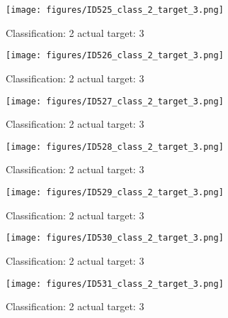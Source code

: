 \begin{figure}[h!]
\begin{center}
\texttt{[image: figures/ID525\_class\_2\_target\_3.png]}
\end{center}
\caption{ Classification: 2 actual target: 3}
\label{fig:ID525_class_2_target_3}
\end{figure}
\begin{figure}[h!]
\begin{center}
\texttt{[image: figures/ID526\_class\_2\_target\_3.png]}
\end{center}
\caption{ Classification: 2 actual target: 3}
\label{fig:ID526_class_2_target_3}
\end{figure}
\begin{figure}[h!]
\begin{center}
\texttt{[image: figures/ID527\_class\_2\_target\_3.png]}
\end{center}
\caption{ Classification: 2 actual target: 3}
\label{fig:ID527_class_2_target_3}
\end{figure}
\begin{figure}[h!]
\begin{center}
\texttt{[image: figures/ID528\_class\_2\_target\_3.png]}
\end{center}
\caption{ Classification: 2 actual target: 3}
\label{fig:ID528_class_2_target_3}
\end{figure}
\begin{figure}[h!]
\begin{center}
\texttt{[image: figures/ID529\_class\_2\_target\_3.png]}
\end{center}
\caption{ Classification: 2 actual target: 3}
\label{fig:ID529_class_2_target_3}
\end{figure}
\begin{figure}[h!]
\begin{center}
\texttt{[image: figures/ID530\_class\_2\_target\_3.png]}
\end{center}
\caption{ Classification: 2 actual target: 3}
\label{fig:ID530_class_2_target_3}
\end{figure}
\begin{figure}[h!]
\begin{center}
\texttt{[image: figures/ID531\_class\_2\_target\_3.png]}
\end{center}
\caption{ Classification: 2 actual target: 3}
\label{fig:ID531_class_2_target_3}
\end{figure}
